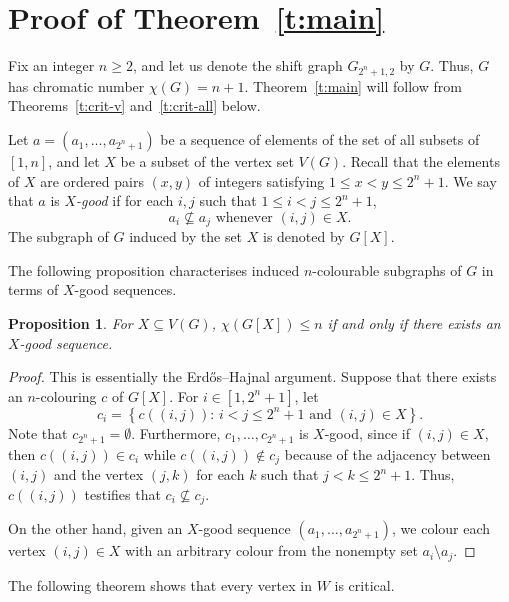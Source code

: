 \documentclass{article}
\newtheorem{proposition}[theorem]{Proposition}
\newcommand\Set[2] {\left\{{#1}:\,{#2}\right\}}
\begin{document}
\section{Proof of Theorem~\ref{t:main}}
\label{sec:proof-main}

Fix an integer $n\geq 2$, and let us denote the shift graph $G_{2^n+1,2}$ by $G$. Thus, $G$ has chromatic number $\chi(G) = n+1$. Theorem~\ref{t:main} will follow from Theorems~\ref{t:crit-v} and~\ref{t:crit-all} below.

Let $a = (a_1,\dots,a_{2^n+1})$ be a sequence of elements of the set
of all subsets of $[1,n]$, and let $X$ be a subset of the vertex set $V(G)$. Recall that the elements of $X$ are ordered pairs $(x,y)$ of integers satisfying $1 \le x < y \le 2^n + 1$. We say that $a$ is \emph{$X$-good}
if for each $i,j$ such that $1 \leq i < j \leq 2^n+1$,
\begin{equation*}
  a_i \not\subseteq a_j \text{ whenever $(i,j)\in X$.}
\end{equation*}
The subgraph of $G$ induced by the set $X$ is denoted by $G[X]$.

The following proposition characterises induced $n$-colourable
subgraphs of $G$ in terms of $X$-good sequences.

\begin{proposition}\label{p:seq}
  For $X\subseteq V(G)$, $\chi(G[X]) \leq n$ if and only if there
  exists an $X$-good sequence.
\end{proposition}
\begin{proof}
  This is essentially the Erd\H{o}s--Hajnal argument. Suppose that there
  exists an $n$-colouring $c$ of $G[X]$. For $i\in [1,2^n+1]$, let
  \begin{equation*}
    c_i = \Set{c((i,j))}{i < j \leq 2^n+1\text{ and } (i,j)\in X}.
  \end{equation*}
  Note that $c_{2^n+1} = \emptyset$. Furthermore,
  $c_1,\dots,c_{2^n+1}$ is $X$-good, since if $(i,j)\in X$, then
  $c((i,j))\in c_i$ while $c((i,j))\notin c_j$ because of the
  adjacency between $(i,j)$ and the vertex $(j,k)$ for each $k$ such
  that $j < k \leq 2^n+1$. Thus, $c((i,j))$ testifies that
  $c_i \not\subseteq c_j$.

  On the other hand, given an $X$-good sequence
  $(a_1,\dots,a_{2^n+1})$, we colour each vertex $(i,j)\in X$ with an
  arbitrary colour from the nonempty set $a_i\setminus a_j$.
\end{proof}

The following theorem shows that every vertex in $W$ is critical.
\end{document}
